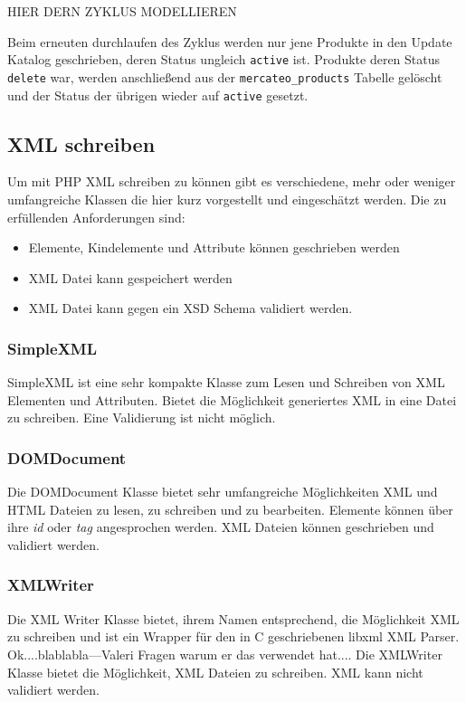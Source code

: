 	HIER DERN ZYKLUS MODELLIEREN
	
	Beim erneuten durchlaufen des Zyklus werden nur jene Produkte in den Update Katalog geschrieben, deren Status ungleich \texttt{active} ist. Produkte deren Status \texttt{delete} war, werden anschließend aus der \texttt{mercateo\_products} Tabelle gelöscht und der Status der übrigen wieder auf \texttt{active} gesetzt.
	
	
	
	
	\subsection{XML schreiben}
		
	Um mit PHP XML schreiben zu können gibt es verschiedene, mehr oder weniger umfangreiche Klassen die hier kurz vorgestellt und eingeschätzt werden.
	Die zu erfüllenden Anforderungen sind:
	\begin{itemize}
	\item Elemente, Kindelemente und Attribute können geschrieben werden
	\item XML Datei kann gespeichert werden
	\item XML Datei kann gegen ein XSD Schema validiert werden.
	\end{itemize}
	
	\subsubsection{SimpleXML}
	
	SimpleXML ist eine sehr kompakte Klasse zum Lesen und Schreiben von XML Elementen und Attributen. Bietet die Möglichkeit generiertes XML in eine Datei zu schreiben.
	Eine Validierung ist nicht möglich.
	
	\subsubsection{DOMDocument}

	Die DOMDocument Klasse bietet sehr umfangreiche Möglichkeiten XML und HTML Dateien zu lesen, zu schreiben und zu bearbeiten. Elemente können über ihre \textit{id} oder \textit{tag} angesprochen werden. XML Dateien können geschrieben und validiert werden.
	
	\subsubsection{XMLWriter}
	Die XML Writer Klasse bietet, ihrem Namen entsprechend, die Möglichkeit XML zu schreiben und ist ein Wrapper für den in C geschriebenen libxml XML Parser.
	Ok....blablabla---Valeri Fragen warum er das verwendet hat....
	Die XMLWriter Klasse bietet die Möglichkeit, XML Dateien zu schreiben. XML kann nicht validiert werden.
	
